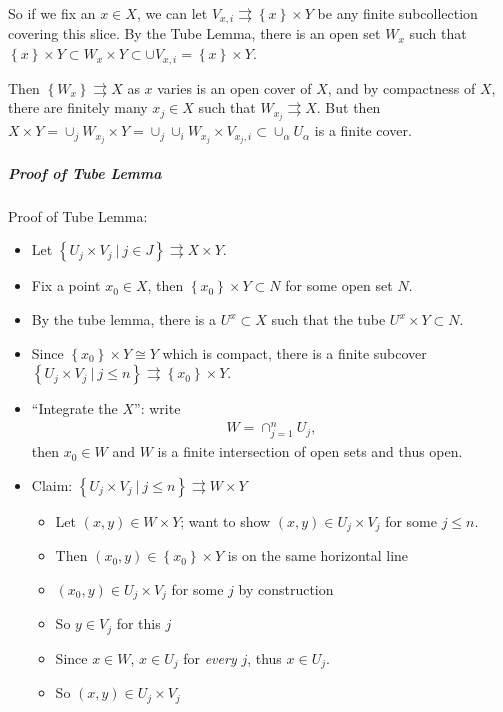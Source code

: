 \begin{solution}
So if we fix an \(x\in X\), we can let
\(V_{x, i} \rightrightarrows \left\{{x}\right\} \times Y\) be any finite
subcollection covering this slice. By the Tube Lemma, there is an open
set \(W_x\) such that
\(\left\{{x}\right\} \times Y \subset W_x \times Y \subset \cup V_{x, i} = \left\{{x}\right\} \times Y\).

Then \(\left\{{W_x}\right\} \rightrightarrows X\) as \(x\) varies is an
open cover of \(X\), and by compactness of \(X\), there are finitely
many \(x_j \in X\) such that \(W_{x_j} \rightrightarrows X\). But then
\(X \times Y = \cup_{j} W_{x_j} \times Y = \cup_j \cup_i W_{x_j} \times V_{x_j, i} \subset \cup_\alpha U_\alpha\)
is a finite cover.

\hypertarget{proof-of-tube-lemma}{%
\subparagraph{Proof of Tube Lemma}\label{proof-of-tube-lemma}}


Proof of Tube Lemma:

\begin{itemize}
\tightlist
\item
  Let
  \(\left\{{U_j\times V_j {~\mathrel{\Big|}~}j\in J}\right\} \rightrightarrows X\times Y\).
\item
  Fix a point \(x_0\in X\), then
  \(\left\{{x_0}\right\}\times Y \subset N\) for some open set \(N\).
\item
  By the tube lemma, there is a \(U^x \subset X\) such that the tube
  \(U^x \times Y \subset N\).
\item
  Since \(\left\{{x_0}\right\}\times Y \cong Y\) which is compact, there
  is a finite subcover
  \(\left\{{U_j \times V_j {~\mathrel{\Big|}~}j\leq n}\right\} \rightrightarrows\left\{{x_0}\right\}\times Y\).
\item
  ``Integrate the \(X\)'': write
  \begin{align*}W = \cap_{j=1}^n U_j,\end{align*}
  then \(x_0 \in W\) and \(W\) is a finite intersection of open sets and
  thus open.
\item
  Claim:
  \(\left\{{U_j \times V_j {~\mathrel{\Big|}~}j\leq n}\right\}\rightrightarrows W\times Y\)

  \begin{itemize}
  \tightlist
  \item
    Let \((x, y) \in W\times Y\); want to show
    \((x, y)\in U_j \times V_j\) for some \(j\leq n\).
  \item
    Then \((x_0, y) \in \left\{{x_0}\right\}\times Y\) is on the same
    horizontal line
  \item
    \((x_0, y)\in U_j \times V_j\) for some \(j\) by construction
  \item
    So \(y\in V_j\) for this \(j\)
  \item
    Since \(x\in W\), \(x\in U_j\) for \emph{every} \(j\), thus
    \(x\in U_j\).
  \item
    So \((x, y) \in U_j \times V_j\)
  \end{itemize}
\end{itemize}

\end{solution}

